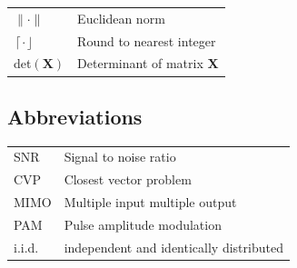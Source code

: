 \documentclass[english,12pt,a4paper,pdftex,sci,utf8]{aaltothesis}
\begin{document}
\begin{tabular}{ll}
$\| \cdot \| $     & Euclidean norm \\
$\left\lceil\cdot\right\rfloor$ & Round to nearest integer \\
det$(\mathbf{X})$  & Determinant of matrix $\mathbf{X}$
\end{tabular}

\subsection*{Abbreviations}

\begin{tabular}{ll}
SNR & Signal to noise ratio \\
CVP & Closest vector problem \\
MIMO & Multiple input multiple output \\
PAM & Pulse amplitude modulation \\
i.i.d. & independent and identically distributed
\end{tabular}


\cleardoublepage
\storeinipagenumber
{}
\setcounter{page}{1}


\end{document}
